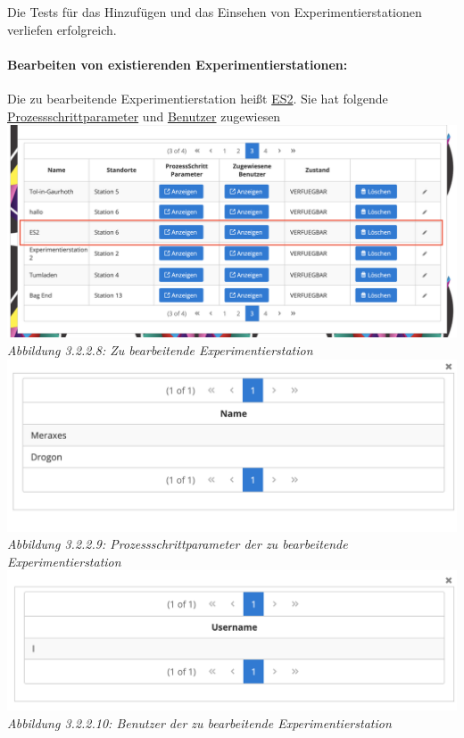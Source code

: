 \documentclass[enabledeprecatedfontcommands,fontsize=12pt,paper=a4,twoside]{scrartcl}
\begin{document}
Die Tests für das Hinzufügen und das Einsehen von Experimentierstationen verliefen erfolgreich. 

\paragraph{Bearbeiten von existierenden Experimentierstationen:} 


Die zu bearbeitende Experimentierstation heißt \hyperlink{sc3.1.3.8}{ES2}. Sie hat folgende \hyperlink{sc3.1.3.9}{Prozessschrittparameter} und \hyperlink{sc3.1.3.10}{Benutzer} zugewiesen\\

\hypertarget{sc3.1.3.8}{
\includegraphics[width=1\textwidth]{Screenshots/3138.png}
\textit{Abbildung 3.2.2.8: Zu bearbeitende Experimentierstation}
} \\

\hypertarget{sc3.1.3.9}{
\includegraphics[width=1\textwidth]{Screenshots/3139.png}
\textit{Abbildung 3.2.2.9: Prozessschrittparameter der zu bearbeitende Experimentierstation}
} \\

\hypertarget{sc3.1.3.10}{
\includegraphics[width=1\textwidth]{Screenshots/31310.png}
\textit{Abbildung 3.2.2.10: Benutzer der zu bearbeitende Experimentierstation}
} \\
\end{document}
